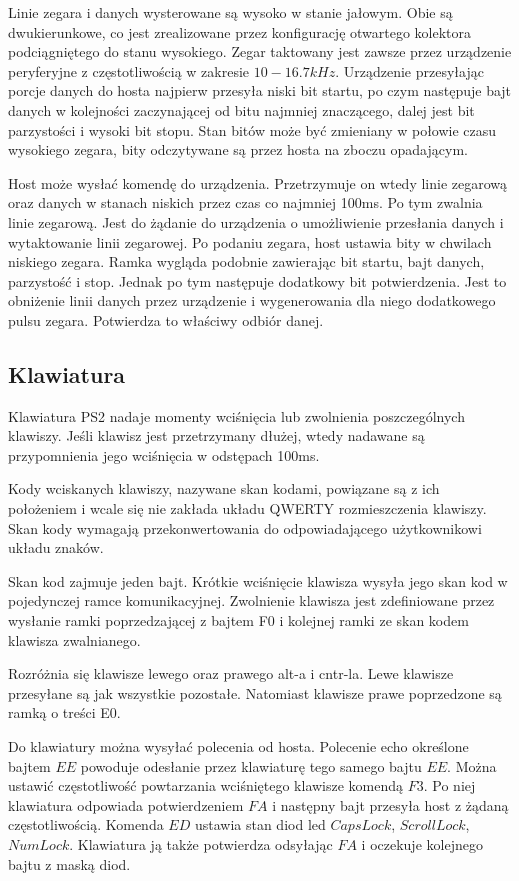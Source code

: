 \documentclass[a4paper,12pt]{article}
\begin{document}
Linie zegara i danych wysterowane są wysoko w stanie jałowym. Obie są dwukierunkowe, co jest zrealizowane przez konfigurację otwartego kolektora podciągniętego do stanu wysokiego. Zegar taktowany jest zawsze przez urządzenie peryferyjne z częstotliwością w zakresie $10 - 16.7 kHz$. Urządzenie przesyłając porcje danych do hosta najpierw przesyła niski bit startu, po czym następuje bajt danych w kolejności zaczynającej od bitu najmniej znaczącego, dalej jest bit parzystości i wysoki bit stopu. Stan bitów może być zmieniany w połowie czasu wysokiego zegara, bity odczytywane są przez hosta na zboczu opadającym.

Host może wysłać komendę do urządzenia. Przetrzymuje on wtedy linie zegarową oraz danych w stanach niskich przez czas co najmniej 100ms. Po tym zwalnia linie zegarową. Jest do żądanie do urządzenia o umożliwienie przesłania danych i wytaktowanie linii zegarowej. Po podaniu zegara, host ustawia bity w chwilach niskiego zegara. Ramka wygląda podobnie zawierając bit startu, bajt danych, parzystość i stop. Jednak po tym następuje dodatkowy bit potwierdzenia. Jest to obniżenie linii danych przez urządzenie i wygenerowania dla niego dodatkowego pulsu zegara. Potwierdza to właściwy odbiór danej.

\subsection{Klawiatura}

Klawiatura PS2 nadaje momenty wciśnięcia lub zwolnienia poszczególnych klawiszy. Jeśli klawisz jest przetrzymany dłużej, wtedy nadawane są przypomnienia jego wciśnięcia w odstępach 100ms.

Kody wciskanych klawiszy, nazywane skan kodami, powiązane są z ich położeniem i wcale się nie zakłada układu QWERTY rozmieszczenia klawiszy. Skan kody wymagają przekonwertowania do odpowiadającego użytkownikowi układu znaków.

Skan kod zajmuje jeden bajt. Krótkie wciśnięcie klawisza wysyła jego skan kod w pojedynczej ramce komunikacyjnej. Zwolnienie klawisza jest zdefiniowane przez wysłanie ramki poprzedzającej z bajtem F0 i kolejnej ramki ze skan kodem klawisza zwalnianego.

Rozróżnia się klawisze lewego oraz prawego alt-a i cntr-la. Lewe klawisze przesyłane są jak wszystkie pozostałe. Natomiast klawisze prawe poprzedzone są ramką o treści E0.

Do klawiatury można wysyłać polecenia od hosta. Polecenie echo określone bajtem $EE$ powoduje odesłanie przez klawiaturę tego samego bajtu $EE$. Można ustawić częstotliwość powtarzania wciśniętego klawisze komendą $F3$. Po niej klawiatura odpowiada potwierdzeniem $FA$ i następny bajt przesyła host z żądaną częstotliwością. Komenda $ED$ ustawia stan diod led $Caps Lock$, $Scroll Lock$, $Num Lock$. Klawiatura ją także potwierdza odsyłając $FA$ i oczekuje kolejnego bajtu z maską diod.
\end{document}
